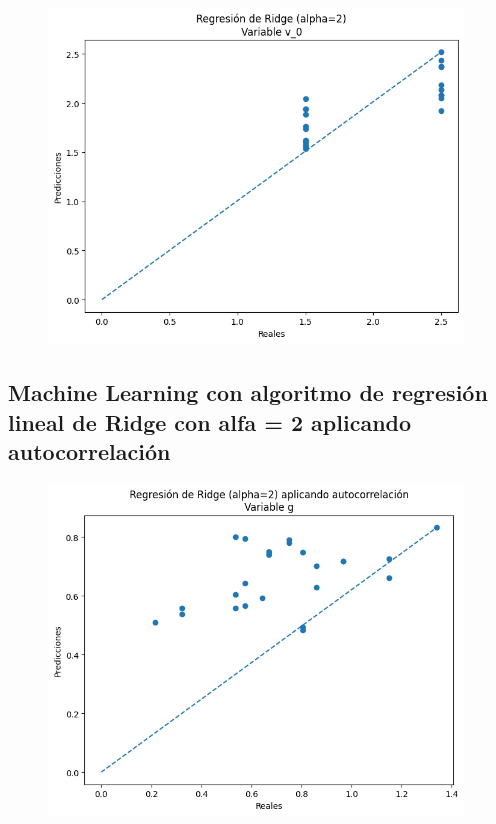 \documentclass[oneside,openright,titlepage,numbers=noenddot,openany,headinclude,footinclude=true,
cleardoublepage=empty,abstractoff,BCOR=5mm,paper=a4,fontsize=12pt,main=spanish]{scrreprt}
\begin{document}
\begin{figure}[H]
	\centering
	\includegraphics[width=11cm]{Regresión de Ridge (alpha=2) Variable v_0.png}
\end{figure}

\subsection{Machine Learning con algoritmo de regresión lineal de Ridge con alfa = 2 aplicando autocorrelación}

\begin{figure}[H]
	\centering
	\includegraphics[width=11cm]{Regresión de Ridge (alpha=2) aplicando autocorrelación Variable g.png}
\end{figure}
\end{document}
